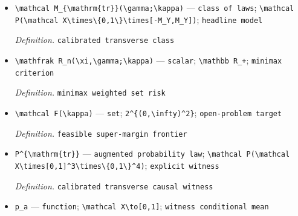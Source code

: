 \documentclass{article}
\begin{document}
\begin{itemize}
  \par\smallskip\noindent\emph{Definition.} \texttt{smooth CATE law class}
  \item \texttt{\textbackslash{}\allowbreak{}mathcal M\_\allowbreak{}\{\textbackslash{}\allowbreak{}mathrm\{tr\}\allowbreak{}\}\allowbreak{}(\textbackslash{}\allowbreak{}gamma;\allowbreak{}\textbackslash{}\allowbreak{}kappa)} --- \texttt{class of laws}; \texttt{\textbackslash{}\allowbreak{}mathcal P(\textbackslash{}\allowbreak{}mathcal X\textbackslash{}\allowbreak{}times\textbackslash{}\allowbreak{}\{0,\allowbreak{}1\textbackslash{}\allowbreak{}\}\allowbreak{}\textbackslash{}\allowbreak{}times[-\allowbreak{}M\_\allowbreak{}Y,\allowbreak{}M\_\allowbreak{}Y])}; \texttt{headline model}
  \par\smallskip\noindent\emph{Definition.} \texttt{calibrated transverse class}
  \item \texttt{\textbackslash{}\allowbreak{}mathfrak R\_\allowbreak{}n(\textbackslash{}\allowbreak{}xi,\allowbreak{}\textbackslash{}\allowbreak{}gamma;\allowbreak{}\textbackslash{}\allowbreak{}kappa)} --- \texttt{scalar}; \texttt{\textbackslash{}\allowbreak{}mathbb R\_\allowbreak{}+\allowbreak{}}; \texttt{minimax criterion}
  \par\smallskip\noindent\emph{Definition.} \texttt{minimax weighted set risk}
  \item \texttt{\textbackslash{}\allowbreak{}mathcal F(\textbackslash{}\allowbreak{}kappa)} --- \texttt{set}; \texttt{2\textasciicircum{}\{(0,\allowbreak{}\textbackslash{}\allowbreak{}infty)\textasciicircum{}2\}\allowbreak{}}; \texttt{open-\allowbreak{}problem target}
  \par\smallskip\noindent\emph{Definition.} \texttt{feasible super-\allowbreak{}margin frontier}
  \item \texttt{P\textasciicircum{}\{\textbackslash{}\allowbreak{}mathrm\{tr\}\allowbreak{}\}\allowbreak{}} --- \texttt{augmented probability law}; \texttt{\textbackslash{}\allowbreak{}mathcal P(\textbackslash{}\allowbreak{}mathcal X\textbackslash{}\allowbreak{}times[0,\allowbreak{}1]\textasciicircum{}3\textbackslash{}\allowbreak{}times\textbackslash{}\allowbreak{}\{0,\allowbreak{}1\textbackslash{}\allowbreak{}\}\allowbreak{}\textasciicircum{}4)}; \texttt{explicit witness}
  \par\smallskip\noindent\emph{Definition.} \texttt{calibrated transverse causal witness}
  \item \texttt{p\_\allowbreak{}a} --- \texttt{function}; \texttt{\textbackslash{}\allowbreak{}mathcal X\textbackslash{}\allowbreak{}to[0,\allowbreak{}1]}; \texttt{witness conditional mean}

\end{itemize}
\end{document}
